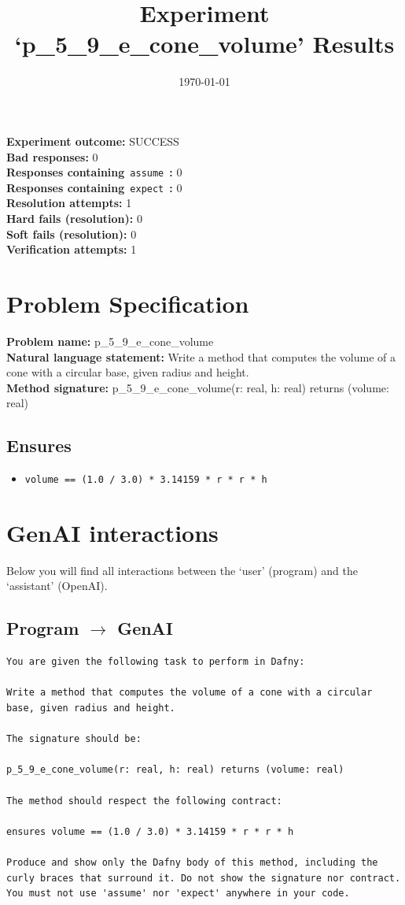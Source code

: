 \documentclass{article}
\begin{document}
\title{Experiment `p\_5\_9\_e\_cone\_volume' Results}
\author{\today}
\date{}
\maketitle
\textbf{Experiment outcome: }SUCCESS
\\\textbf{Bad responses: }0
\\\textbf{Responses containing}~\texttt{assume}~\textbf{: }0
\\\textbf{Responses containing}~\texttt{expect}~\textbf{: }0
\\\textbf{Resolution attempts: }1
\\\textbf{Hard fails (resolution): }0
\\\textbf{Soft fails (resolution): }0
\\\textbf{Verification attempts: }1
\section*{Problem Specification}
\textbf{Problem name: }p\_5\_9\_e\_cone\_volume
\\\textbf{Natural language statement: }Write a method that computes the volume of a cone with a circular base, given radius and height.
\\\textbf{Method signature: }p\_5\_9\_e\_cone\_volume(r: real, h: real) returns (volume: real)
\subsection*{Ensures}
\begin{itemize}
\item \texttt{volume == (1.0 / 3.0) * 3.14159 * r * r * h}
\end{itemize}
\clearpage
\section*{GenAI interactions}
Below you will find all interactions between the `user' (program) and the `assistant' (OpenAI).
\subsection*{Program $\rightarrow$ GenAI}
\begin{lstlisting}
You are given the following task to perform in Dafny:

Write a method that computes the volume of a cone with a circular base, given radius and height.

The signature should be:

p_5_9_e_cone_volume(r: real, h: real) returns (volume: real)

The method should respect the following contract:

ensures volume == (1.0 / 3.0) * 3.14159 * r * r * h

Produce and show only the Dafny body of this method, including the curly braces that surround it. Do not show the signature nor contract. You must not use 'assume' nor 'expect' anywhere in your code.
\end{lstlisting}
\end{document}
